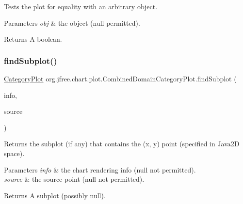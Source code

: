 Tests the plot for equality with an arbitrary object.


\begin{DoxyParams}{Parameters}
{\em obj} & the object ({\ttfamily null} permitted).\\
\hline
\end{DoxyParams}
\begin{DoxyReturn}{Returns}
A boolean. 
\end{DoxyReturn}
\mbox{\label{classorg_1_1jfree_1_1chart_1_1plot_1_1_combined_domain_category_plot_aef2c18af52f7b69d9259de4ad074425d}} 
\subsubsection{\texorpdfstring{find\+Subplot()}{findSubplot()}}
{\footnotesize\ttfamily \mbox{\hyperlink{classorg_1_1jfree_1_1chart_1_1plot_1_1_category_plot}{Category\+Plot}} org.\+jfree.\+chart.\+plot.\+Combined\+Domain\+Category\+Plot.\+find\+Subplot (\begin{DoxyParamCaption}\item[{\mbox{\hyperlink{classorg_1_1jfree_1_1chart_1_1plot_1_1_plot_rendering_info}{Plot\+Rendering\+Info}}}]{info,  }\item[{Point2D}]{source }\end{DoxyParamCaption})}

Returns the subplot (if any) that contains the (x, y) point (specified in Java2D space).


\begin{DoxyParams}{Parameters}
{\em info} & the chart rendering info ({\ttfamily null} not permitted). \\
\hline
{\em source} & the source point ({\ttfamily null} not permitted).\\
\hline
\end{DoxyParams}
\begin{DoxyReturn}{Returns}
A subplot (possibly {\ttfamily null}). 
\end{DoxyReturn}
\mbox{\label{classorg_1_1jfree_1_1chart_1_1plot_1_1_combined_domain_category_plot_ac5d8ee1479835bbce04b4295f5e388ab}} 
